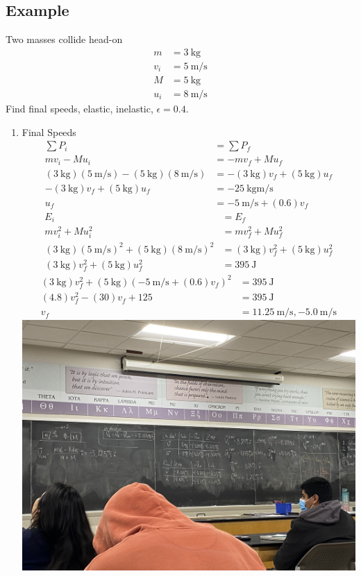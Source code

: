 \documentclass{article}
\begin{document}
\subsection{Example}

Two masses collide head-on
\begin{align*}
	m & = \SI{3}{\kilogram} \\
	v_i & = \SI{5}{\meter \per \second} \\
	M & = \SI{5}{\kilogram} \\
	u_i & = \SI{8}{\meter \per \second}
\end{align*}
Find final speeds, elastic, inelastic, $ \epsilon = 0.4 $.
\begin{enumerate}[label = \textbf{\arabic*)}]
	\item Final Speeds
		\begin{align*}
			\sum P_i & = \sum P_f \\
			mv_i - Mu_i & = -mv_f + Mu_f \\
			(\SI{3}{\kilogram})(\SI{5}{\meter \per \second}) - (\SI{5}{\kilogram})(\SI{8}{\meter \per \second}) & = -(\SI{3}{\kilogram})v_f + (\SI{5}{\kilogram})u_f \\
			-(\SI{3}{\kilogram})v_f + (\SI{5}{\kilogram})u_f & = -\SI{25}{\kilogram \meter \per \second} \\
			u_f & = -\SI{5}{\meter \per \second} + (0.6)v_f
		\end{align*}
		\begin{align*}
			E_i & = E_f \\
			mv_i^2 + Mu_i^2 & = mv_f^2 + Mu_f^2 \\
			(\SI{3}{\kilogram})(\SI{5}{\meter \per \second})^2 + (\SI{5}{\kilogram})(\SI{8}{\meter \per \second})^2 & = (\SI{3}{\kilogram})v_f^2 + (\SI{5}{\kilogram})u_f^2 \\
			(\SI{3}{\kilogram})v_f^2 + (\SI{5}{\kilogram})u_f^2 & = \SI{395}{\joule}
		\end{align*}
		\begin{align*}
			(\SI{3}{\kilogram})v_f^2 + (\SI{5}{\kilogram})(-\SI{5}{\meter \per \second} + (0.6)v_f)^2 & = \SI{395}{\joule} \\
			(4.8)v_f^2 - (30)v_f + 125 & = \SI{395}{\joule} \\
			v_f & = \SI{11.25}{\meter \per \second}, -\SI{5.0}{\meter \per \second}
		\end{align*}
		\includegraphics[width = \linewidth]{example_2.jpg}
\end{enumerate}
\end{document}
